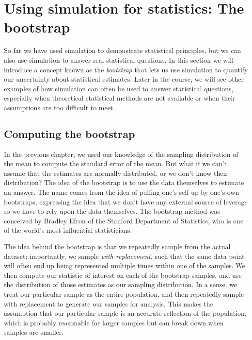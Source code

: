 \documentclass[
  12pt,
]{book}
\begin{document}
\hypertarget{using-simulation-for-statistics-the-bootstrap}{%
\section{Using simulation for statistics: The bootstrap}\label{using-simulation-for-statistics-the-bootstrap}}

So far we have used simulation to demonstrate statistical principles, but we can also use simulation to answer real statistical questions. In this section we will introduce a concept known as the \emph{bootstrap} that lets us use simulation to quantify our uncertainty about statistical estimates. Later in the course, we will see other examples of how simulation can often be used to answer statistical questions, especially when theoretical statistical methods are not available or when their assumptions are too difficult to meet.

\hypertarget{computing-the-bootstrap}{%
\subsection{Computing the bootstrap}\label{computing-the-bootstrap}}

In the previous chapter, we used our knowledge of the sampling distribution of the mean to compute the standard error of the mean. But what if we can't assume that the estimates are normally distributed, or we don't know their distribution? The idea of the bootstrap is to use the data themselves to estimate an answer. The name comes from the idea of pulling one's self up by one's own bootstraps, expressing the idea that we don't have any external source of leverage so we have to rely upon the data themselves. The bootstrap method was conceived by Bradley Efron of the Stanford Department of Statistics, who is one of the world's most influential statisticians.

The idea behind the bootstrap is that we repeatedly sample from the actual dataset; importantly, we sample \emph{with replacement}, such that the same data point will often end up being represented multiple times within one of the samples. We then compute our statistic of interest on each of the bootstrap samples, and use the distribution of those estimates as our sampling distribution. In a sense, we treat our particular sample as the entire population, and then repeatedly sample with replacement to generate our samples for analysis. This makes the assumption that our particular sample is an accurate reflection of the population, which is probably reasonable for larger samples but can break down when samples are smaller.
\end{document}
